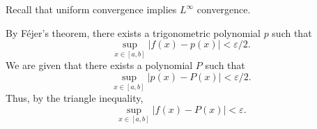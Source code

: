 \documentclass[12 pt, letterpaper]{hmcpset}
\begin{document}
\begin{solution}
	Recall that uniform convergence implies $L^{\infty}$ convergence.

	By F\'ejer's theorem, there exists a trigonometric polynomial $p$ such that
	\[
		\sup_{x \in [a, b]} \lvert f(x) - p(x) \rvert < \varepsilon /2.
	\]
	We are given that there exists a polynomial $P$ such that
	\[
		\sup_{x \in [a, b]} \lvert p(x) - P(x) \rvert < \varepsilon / 2.
	\]
	Thus, by the triangle inequality,
	\[
		\sup_{x \in [a, b]} \lvert f(x) - P(x) \rvert < \varepsilon.
	\]
\end{solution}
\end{document}
